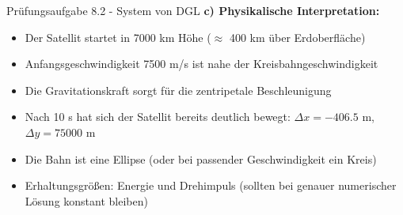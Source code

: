 \begin{example2}{Prüfungsaufgabe 8.2 - System von DGL}
\textbf{c) Physikalische Interpretation:}
\begin{itemize}
    \item Der Satellit startet in 7000 km Höhe ($\approx$ 400 km über Erdoberfläche)
    \item Anfangsgeschwindigkeit 7500 m/s ist nahe der Kreisbahngeschwindigkeit 
    \item Die Gravitationskraft sorgt für die zentripetale Beschleunigung
    \item Nach 10 s hat sich der Satellit bereits deutlich bewegt: $\Delta x = -406.5$ m, $\Delta y = 75000$ m
    \item Die Bahn ist eine Ellipse (oder bei passender Geschwindigkeit ein Kreis)
    \item Erhaltungsgrößen: Energie und Drehimpuls (sollten bei genauer numerischer Lösung konstant bleiben)
\end{itemize}
\end{example2}

